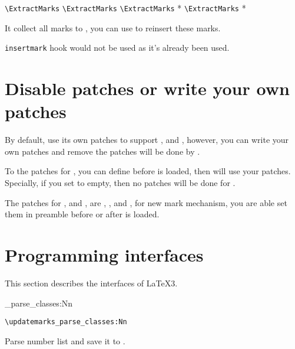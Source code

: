 \documentclass{l3doc}
\begin{document}
\begin{function}[added=2024-02-19]{\ExtractMarksTo}
  \begin{syntax}
    \verb|\ExtractMarks|  
    \verb|\ExtractMarks|   
    \verb|\ExtractMarks| *  
    \verb|\ExtractMarks| *   
  \end{syntax}
It collect all marks to , you can use \tn[no-index] to reinsert
these marks.

\texttt{insertmark} hook would not be used as it's already been used.
\end{function}

\section{Disable patches or write your own patches}

By default,  use its own patches to support ,
 and , however, you can write your own patches and 
remove the patches will be done by .

To the patches for , you can define 
before  is loaded, then  will use your patches.
Specially, if you set  to empty, then no patches will 
be done for .

The patches for ,  and , 
are , , 
 and \linebreak{},
 for new mark mechanism,
you are able set them in preamble before or after  is loaded.


\section{Programming interfaces}

This section describes the interfaces of \LaTeX3.

\begin{function}[added=2024-02-19]{\updatemarks_parse_classes:Nn}
  \begin{syntax}
    \verb|\updatemarks_parse_classes:Nn|  
  \end{syntax}
Parse number list and save it to .
\end{function}
\end{document}
